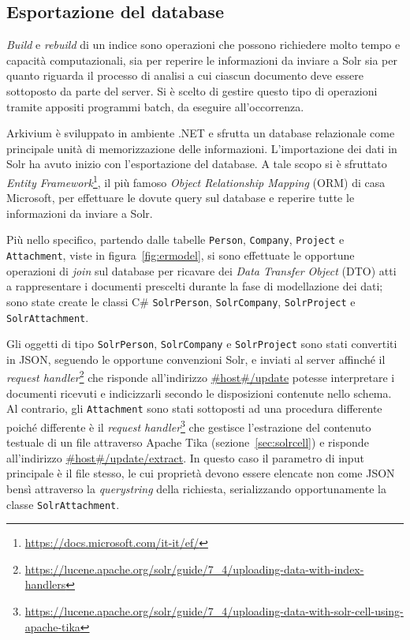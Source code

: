 \subsection{Esportazione del database}

\textit{Build} e \textit{rebuild} di un indice sono operazioni che possono richiedere molto tempo e capacità computazionali, sia per reperire le informazioni da inviare a Solr sia per quanto riguarda il processo di analisi a cui ciascun documento deve essere sottoposto da parte del server. Si è scelto di gestire questo tipo di operazioni tramite appositi programmi batch, da eseguire all’occorrenza.

\vspace{1em}

Arkivium è sviluppato in ambiente .NET e sfrutta un database relazionale come principale unità di memorizzazione delle informazioni. L’importazione dei dati in Solr ha avuto inizio con l’esportazione del database. A tale scopo si è sfruttato \textit{Entity Framework}\footnote{\url{https://docs.microsoft.com/it-it/ef/}}, il più famoso \textit{Object Relationship Mapping} (ORM) di casa Microsoft, per effettuare le dovute query sul database e reperire tutte le informazioni da inviare a Solr. 

\vspace{1em}

Più nello specifico, partendo dalle tabelle \texttt{Person}, \texttt{Company}, \texttt{Project} e \texttt{Attachment}, viste in figura~\ref{fig:ermodel}, si sono effettuate le opportune operazioni di \textit{join} sul database per ricavare dei \textit{Data Transfer Object} (DTO) atti a rappresentare i documenti prescelti durante la fase di modellazione dei dati; sono state create le classi C\# \texttt{SolrPerson}, \texttt{SolrCompany}, \texttt{SolrProject} e \texttt{SolrAttachment}.

Gli oggetti di tipo \texttt{SolrPerson}, \texttt{SolrCompany} e \texttt{SolrProject} sono stati convertiti in JSON, seguendo le opportune convenzioni Solr, e inviati al server affinché il \textit{request handler}\footnote{\url{https://lucene.apache.org/solr/guide/7_4/uploading-data-with-index-handlers}}  che risponde all’indirizzo \url{\#host\#/update} potesse interpretare i documenti ricevuti e indicizzarli secondo le disposizioni contenute nello schema. \newline
Al contrario, gli \texttt{Attachment} sono stati sottoposti ad una procedura differente poiché differente è il \textit{request handler}\footnote{\url{https://lucene.apache.org/solr/guide/7_4/uploading-data-with-solr-cell-using-apache-tika}} che gestisce l’estrazione del contenuto testuale di un file attraverso Apache Tika (sezione~\ref{sec:solrcell}) e risponde all’indirizzo \url{\#host\#/update/extract}. In questo caso il parametro di input principale è il file stesso, le cui proprietà devono essere elencate non come JSON bensì attraverso la \textit{querystring} della richiesta, serializzando opportunamente la classe \texttt{SolrAttachment}.

